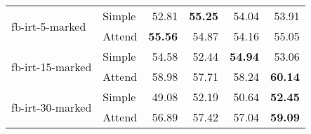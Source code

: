 \begin{tabular}{| l | l | r | r | r | r |}
    \multirow{2}{*}{fb-irt-5-marked}
    & Simple & 52.81 & \textbf{55.25} & 54.04 & 53.91 \\
    & Attend & \textbf{55.56} & 54.87 & 54.16 & 55.05 \\ \hline

    \multirow{2}{*}{fb-irt-15-marked}
    & Simple & 54.58 & 52.44 & \textbf{54.94} & 53.06 \\
    & Attend & 58.98 & 57.71 & 58.24 & \textbf{60.14} \\ \hline

    \multirow{2}{*}{fb-irt-30-marked}
    & Simple & 49.08 & 52.19 & 50.64 & \textbf{52.45} \\
    & Attend & 56.89 & 57.42 & 57.04 & \textbf{59.09} \\ \hline

\end{tabular}
